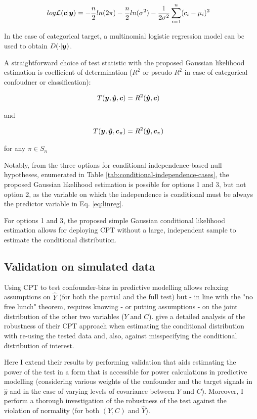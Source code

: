 \documentclass{article}
\begin{document}
$$ log\mathcal{L}(\boldsymbol{c}|\boldsymbol{y}) = - \frac{n}{2} ln(2 \pi) -  \frac{n}{2} ln( \sigma^2) - \frac{1}{2 \sigma^2} \sum_{i=1}^n (c_i - \mu_i)^2 $$

In the case of categorical target, a multinomial logistic regression model can be used to obtain $D(\cdot|\boldsymbol{y})$.

A straightforward choice of test statistic with the proposed Gaussian likelihood estimation is coefficient of determination ($R^2$ or pseudo $R^2$ in case of categorical confoudner or classification):

$$T(\boldsymbol{y}, \boldsymbol{\hat{y}}, \boldsymbol{c}) = R^2(\boldsymbol{\hat{y}}, \boldsymbol{c})$$ 

and

$$T(\boldsymbol{y}, \boldsymbol{\hat{y}}, \boldsymbol{c}_\pi) = R^2(\boldsymbol{\hat{y}}, \boldsymbol{c}_\pi)$$ 

for any $\pi \in S_n$

Notably, from the three options for conditional independence-based null hypotheses, enumerated in Table \ref{tab:conditional-independence-cases}, the proposed Gaussian likelihood estimation is possible for options 1 and 3, but not option 2, as the variable on which the independence is conditional must be always the predictor variable in Eq. \ref{eq:linreg}.

For options 1 and 3, the proposed simple Gaussian conditional likelihood estimation allows for deploying CPT without a large, independent sample to estimate the conditional distribution. 


\subsection{Validation on simulated data}

Using CPT to test confounder-bias in predictive modelling allows relaxing assumptions on $\hat{Y}$ (for both the partial and the full test) but - in line with the "no free lunch" theorem, requires knowing - or putting assumptions - on the joint distribution of the other two variables ($Y$ and $C$). 
\cite{berrett2020conditional} give a detailed analysis of the robustness of their CPT approach when estimating the conditional distribution with re-using the tested data and, also, against misspecifying the conditional distribution of interest.

Here I extend their results by performing validation that aids estimating the power of the test in a form that is accessible for power calculations in predictive modelling (considering various weights of the confounder and the target signals in $\hat{y}$ and in the case of varying levels of covariance between $Y$ and $C$).
Moreover, I perform a thorough investigation of the robustness of the test against the violation of normality (for both $(Y, C)$ and $\hat{Y}$).
\end{document}

